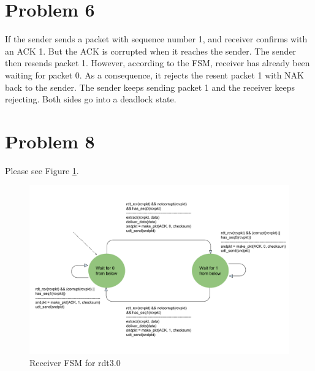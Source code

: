 \documentclass[titlepage, paper=a4, fontsize=11pt]{scrartcl} %
\numberwithin{equation}{section} %
\numberwithin{table}{section} %
\begin{document}

\section*{Problem 6}
If the sender sends a packet with sequence number 1, and receiver confirms with an ACK 1.
But the ACK is corrupted when it reaches the sender. The sender then resends packet 1. However,
according to the FSM, receiver has already been waiting for packet 0. As a consequence, it rejects
the resent packet 1 with NAK back to the sender. The sender keeps sending packet 1 and the receiver
keeps rejecting. Both sides go into a deadlock state.
\\


\section*{Problem 8}
Please see Figure \ref{fig:rdt3}.
\begin{figure}[!ht]
    \includegraphics[width=\textwidth]{images/rdt3-rcv-FSM.pdf}
    \caption{Receiver FSM for rdt3.0}
    \label{fig:rdt3}
\end{figure}



\end{document}
